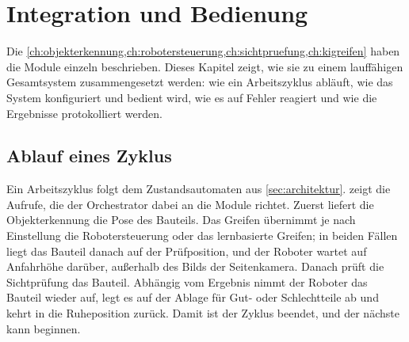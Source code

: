 \chapter{Integration und Bedienung}
\label{ch:integration}

Die \cref{ch:objekterkennung,ch:robotersteuerung,ch:sichtpruefung,ch:kigreifen} haben die
Module einzeln beschrieben. Dieses Kapitel zeigt, wie sie zu einem lauffähigen Gesamtsystem zusammengesetzt
werden: wie ein Arbeitszyklus abläuft, wie das System konfiguriert und bedient wird, wie es
auf Fehler reagiert und wie die Ergebnisse protokolliert werden.

\section{Ablauf eines Zyklus}
\label{sec:int-zyklus}

Ein Arbeitszyklus folgt dem Zustandsautomaten aus \cref{sec:architektur}.
 zeigt die Aufrufe, die der Orchestrator dabei an die Module richtet.
Zuerst liefert die Objekterkennung die Pose des Bauteils. Das Greifen übernimmt je nach
Einstellung die Robotersteuerung oder das lernbasierte Greifen; in beiden Fällen liegt das
Bauteil danach auf der Prüfposition, und der Roboter wartet auf Anfahrhöhe darüber, außerhalb
des Bilds der Seitenkamera. Danach prüft die Sichtprüfung das Bauteil. Abhängig vom Ergebnis
nimmt der Roboter das Bauteil wieder auf, legt es auf der Ablage für Gut- oder Schlechtteile
ab und kehrt in die Ruheposition zurück. Damit ist der Zyklus beendet, und der nächste kann
beginnen.

